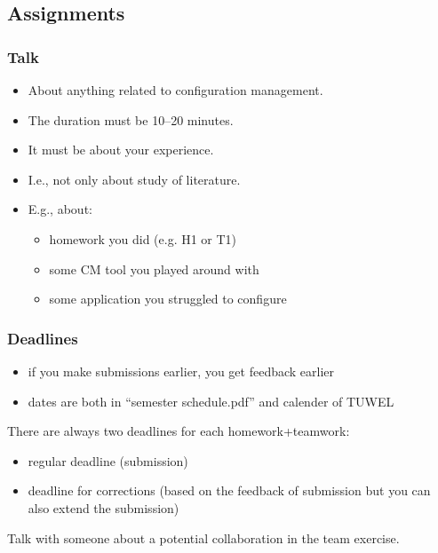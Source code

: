 \subsection{Assignments}
\begin{frame}
	\frametitle{Talk}
	\begin{itemize}
		\item About anything related to configuration management.
		\item The duration must be 10--20 minutes.
		\item It must be about your experience.
		\item I.e., not only about study of literature.
		\item E.g., about:
		\begin{itemize}
			\item homework you did (e.g. H1 or T1)
			\item some CM tool you played around with
			\item some application you struggled to configure
		\end{itemize}
	\end{itemize}
\end{frame}

\begin{frame}
	\frametitle{Deadlines}

	\begin{itemize}
	\item if you make submissions earlier, you get feedback earlier
	\item dates are both in ``semester schedule.pdf'' and calender of TUWEL
	\end{itemize}

	There are always two deadlines for each homework+teamwork:

	\begin{itemize}
	\item regular deadline (submission)
	\item deadline for corrections (based on the feedback of submission but you can also extend the submission)
	\end{itemize}
\end{frame}

\begin{assignment}
	\begin{task}
	Talk with someone about a potential collaboration in the team exercise.
	\end{task}
\end{assignment}

